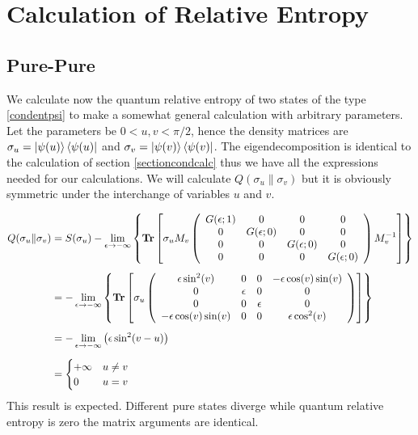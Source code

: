 \section{Calculation of Relative Entropy}
\subsection{Pure-Pure}
We calculate now the quantum relative entropy of two states of the type \eqref{condentpsi} to make a somewhat general calculation with arbitrary parameters. Let the parameters be $0<u,v<\pi/2$,
hence the density matrices are $\sigma_u=\ket{\psi(u)}\bra{\psi(u)}$ and $\sigma_v=\ket{\psi(v)}\bra{\psi(v)}$. The eigendecomposition is identical to the calculation of section \ref{sectioncondcalc} thus we have all the expressions needed for our calculations.
We will calculate $Q(\sigma_u \| \sigma_v)$ but it is obviously symmetric under the interchange of variables $u$ and $v$. 

\begin{align}
Q(\sigma_u \| \sigma_v) &=S(\sigma_u)-\lim_{\epsilon \to -\infty} \left\{ \operatorname{\textup{\textbf{Tr}}} \left[
\sigma_u M_v
\left(
\begin{array}{cccc}
 G(\epsilon;1) & 0 & 0 & 0 \\
 0 &  G(\epsilon;0) & 0 & 0 \\
 0 & 0 &  G(\epsilon;0) & 0 \\
 0 & 0 & 0 &  G(\epsilon;0) \\
\end{array}
\right) M_v^{-1} \right] \right\} \nonumber \\[0.5em]
&= -\lim_{\epsilon \to -\infty} \left\{ \operatorname{\textup{\textbf{Tr}}} \left[ \sigma_u
\left(
\begin{array}{cccc}
 \epsilon  \sin ^2(v) & 0 & 0 & -\epsilon  \cos (v) \sin (v) \\
 0 & \epsilon  & 0 & 0 \\
 0 & 0 & \epsilon  & 0 \\
 -\epsilon  \cos (v) \sin (v) & 0 & 0 & \epsilon  \cos ^2(v) \\
\end{array}
\right)
 \right] \right\} \nonumber \\[0.5em]
&=-\lim_{\epsilon \to -\infty} \left( \epsilon  \sin ^2(v-u) \right) \nonumber \\[0.5em]
&=
\begin{cases}
   +\infty   &   u \neq v\\
   0  &   u=v
\end{cases}
\end{align}
This result is expected. Different pure states diverge while quantum relative entropy is zero the matrix arguments are identical.
